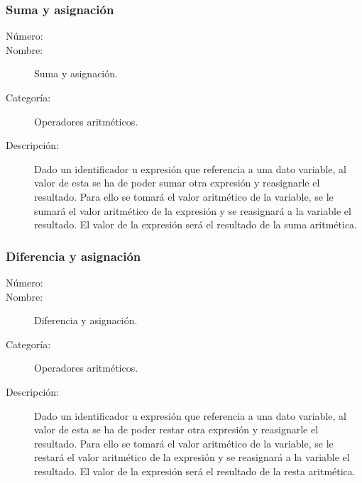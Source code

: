 \subsubsection{Suma y asignación}
\begin{framed}
	\begin{description}
		\item [Número:] \cn
		\item [Nombre:] Suma y asignación.
		\item [Categoría:] Operadores aritméticos.
		\item [Descripción:] Dado un identificador u expresión que referencia a una dato variable, al valor de esta se ha de poder sumar otra expresión
		y reasignarle el resultado. Para ello se tomará el valor aritmético de la variable, se le sumará el valor aritmético de la expresión
		y se reasignará a la variable el resultado. El valor de la expresión será el resultado de la suma aritmética.
	\end {description}
\end{framed}

\subsubsection{Diferencia y asignación}
\begin{framed}
	\begin{description}
		\item [Número:] \cn
		\item [Nombre:] Diferencia y asignación.
		\item [Categoría:] Operadores aritméticos.
		\item [Descripción:] Dado un identificador u expresión que referencia a una dato variable, al valor de esta se ha de poder restar otra expresión
		y reasignarle el resultado. Para ello se tomará el valor aritmético de la variable, se le restará el valor aritmético de la expresión
		y se reasignará a la variable el resultado. El valor de la expresión será el resultado de la resta aritmética.
	\end {description}
\end{framed}

